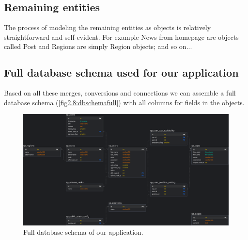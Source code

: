 \subsection*{Remaining entities}
The process of modeling the remaining entities as objects is relatively straightforward and self-evident. For example News from homepage are objects called Post and Regions are simply Region objects; and so on...
\newpage
\subsection*{Full database schema used for our application}
Based on all these merges, conversions and connections we can assemble a full database schema (\autoref{fig2.8:dbschemafull}) with all columns for fields in the objects.
\begin{figure}[h]	
	\centering	
    \includegraphics[scale=0.2175]{img/swimmpair_db_schema.png}
	\caption{Full database schema of our application.}
	\label{fig2.8:dbschemafull}
\end{figure}

